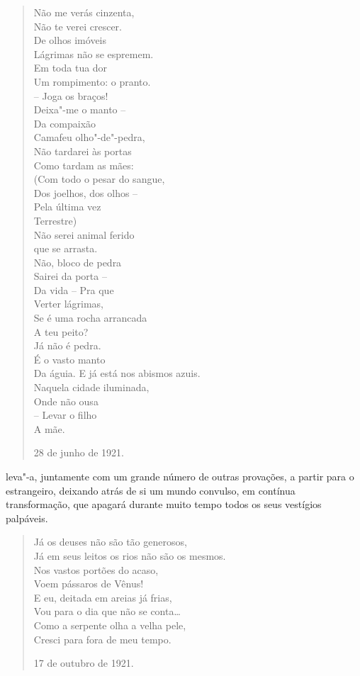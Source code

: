 \begin{verse}
Não me verás cinzenta, \\
Não te verei crescer. \\
De olhos imóveis \\
Lágrimas não se espremem. \\[8pt]
Em toda tua dor \\
Um rompimento: o pranto. \\
-- Joga os braços! \\
Deixa"-me o manto -- \\[8pt]
Da compaixão \\
Camafeu olho"-de"-pedra, \\
Não tardarei às portas \\
Como tardam as mães: \\[8pt]
(Com todo o pesar do sangue, \\
Dos joelhos, dos olhos -- \\
Pela última vez \\
Terrestre) \\
Não serei animal ferido \\
que se arrasta. \\[8pt]
Não, bloco de pedra \\
Sairei da porta -- \\
Da vida -- Pra que \\
Verter lágrimas, \\
Se é uma rocha arrancada \\
A teu peito? \\[8pt]
Já não é pedra. \\
É o vasto manto \\
Da águia. E já está nos abismos azuis. \\
Naquela cidade iluminada, \\
Onde não ousa \\
-- Levar o filho \\
A mãe.
\begin{flushright}
28 de junho de 1921.
\end{flushright}
\end{verse}

leva"-a, juntamente com um grande número de outras provações, a partir
para o estrangeiro, deixando atrás de si um mundo convulso, em contínua
transformação, que apagará durante muito tempo todos os seus vestígios
palpáveis.

\begin{verse}
Já os deuses não são tão generosos, \\
Já em seus leitos os rios não são os mesmos. \\
Nos vastos portões do acaso, \\
Voem pássaros de Vênus! \\[8pt]
E eu, deitada em areias já frias, \\
Vou para o dia que não se conta\ldots{} \\
Como a serpente olha a velha pele, \\
Cresci para fora de meu tempo. \\
\begin{flushright}
17 de outubro de 1921.
\end{flushright}
\end{verse}

